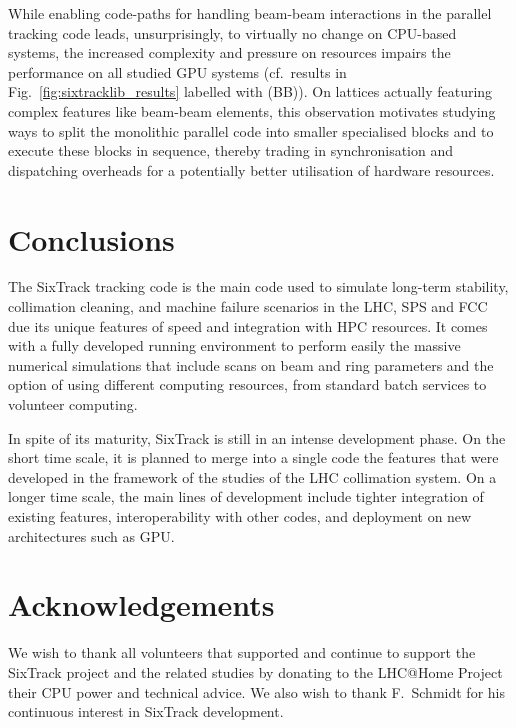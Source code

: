 \documentclass[a4paper,
              ]{jacow}
\begin{document}
While enabling code-paths for handling beam-beam interactions in the parallel tracking code leads, unsurprisingly, to virtually no change on CPU-based systems, the increased complexity and pressure on resources impairs the performance on all studied GPU systems (cf.\ results in Fig.~\ref{fig:sixtracklib_results} labelled with (BB)).
On lattices actually featuring complex features like beam-beam elements, this observation motivates studying ways to split the monolithic parallel code into smaller specialised blocks and to execute these blocks in sequence, thereby trading in synchronisation and dispatching overheads for a potentially better utilisation of hardware resources.

\section{Conclusions}

The SixTrack tracking code is the main code used to simulate long-term stability, collimation cleaning, and machine failure scenarios in the LHC, SPS and FCC due its unique features of speed and integration with HPC resources. It comes with a fully developed running environment to perform easily the massive numerical simulations that include scans on beam and ring parameters and the option of using different computing resources, from standard batch services to volunteer computing. 

In spite of its maturity, SixTrack is still in an intense development phase. On the short time scale, it is planned to merge into a single code the features that were developed in the framework of the studies of the LHC collimation system. On a longer time scale, the main lines of development include  tighter integration of existing features, interoperability with other codes, and deployment on new architectures such as GPU.

\section{Acknowledgements}

We wish to thank all volunteers that supported and continue to support the SixTrack project and the related studies by donating  to the LHC@Home Project their CPU power and technical advice. We also wish to thank F.~Schmidt for his continuous interest in SixTrack development.
\end{document}
